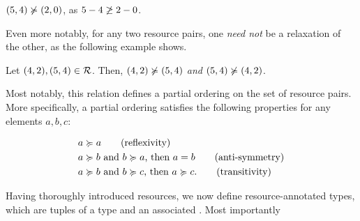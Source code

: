 \begin{example}
   \((5, 4) \notrelaxation (2, 0)\), as \(5 - 4 \centernot{\geq} 2 - 0\).
\end{example}

Even more notably, for any two resource pairs, one \emph{need not} be a relaxation of the other, as the following example shows.

\begin{example}
   Let \((4,2), (5,4) \in \mathcal{R}\). Then, \((4,2) \notrelaxation (5,4)\) \emph{and} \((5,4) \notrelaxation (4,2)\).
\end{example}

Most notably, this relation defines a partial ordering on the set of resource pairs. More specifically, a partial ordering satisfies the following properties for any elements \(a, b, c\):

\begin{align}
   & a \relaxation a \tag{reflexivity} \\
   & a \relaxation b \text{ and } b \relaxation a\text{, then } a = b \tag{anti-symmetry}\\
   & a \relaxation b \text{ and } b \relaxation c\text{, then } a \relaxation c. \tag{transitivity}
\end{align}

Having thoroughly introduced resources, we now define resource-annotated types, which are tuples of a type and an associated . Most importantly
